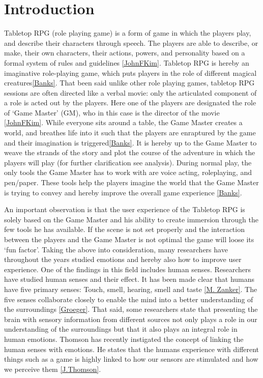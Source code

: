 \chapter{Introduction} 
Tabletop RPG (role playing game) is a form of game in which the players play, and describe their characters through speech. The players are able to describe, or make, their own characters, their actions, powers, and personality based on a formal system of rules and guidelines \ref{JohnFKim}. Tabletop RPG is hereby an imaginative role-playing game, which puts players in the role of different magical creatures\ref{Banks}.
That been said unlike other role playing games, tabletop RPG sessions are often directed like a verbal movie: only the articulated component of a role is acted out by the players. Here one of the players are designated the role of ‘Game Master’ (GM), who in this case is the director of the movie \ref{JohnFKim}. While everyone sits around a table, the Game Master creates a world, and breathes life into it such that the players are enraptured by the game and their imagination is triggered\ref{Banks}. It is hereby up to the Game Master to weave the strands of the story and plot the course of the adventure in which the players will play (for further clarification see analysis).
During normal play, the only tools the Game Master has to work with are voice acting, roleplaying, and pen/paper. These tools help the players imagine the world that the Game Master is trying to convey and hereby improve the overall game experience \ref{Banks}.  

An important observation is that the user experience of the Tabletop RPG is solely based on the Game Master and his ability to create immersion through the few tools he has available. If the scene is not set properly and the interaction between the players and the Game Master is not optimal the game will loose its ‘fun factor’. 
Taking the above into consideration, many researchers have throughout the years studied emotions and hereby also how to improve user experience. One of the findings in this field includes human senses. 
Researchers have studied human senses and their effect. It has been made clear that humans have five primary senses: Touch, smell, hearing, smell and taste \ref{M. Zanker}.  The five senses collaborate closely to enable the mind into a better understanding of the surroundings \ref{Groeger}. 
That said, some researchers state that presenting the brain with sensory information from different sources not only plays a role in our understanding of the surroundings but that it also plays an integral role in human emotions. Thomson has recently instigated the concept of linking the human senses with emotions. He states that the humans experience with different things such as a game is highly linked to how our sensors are stimulated and how we perceive them \ref{J.Thomson}. 

